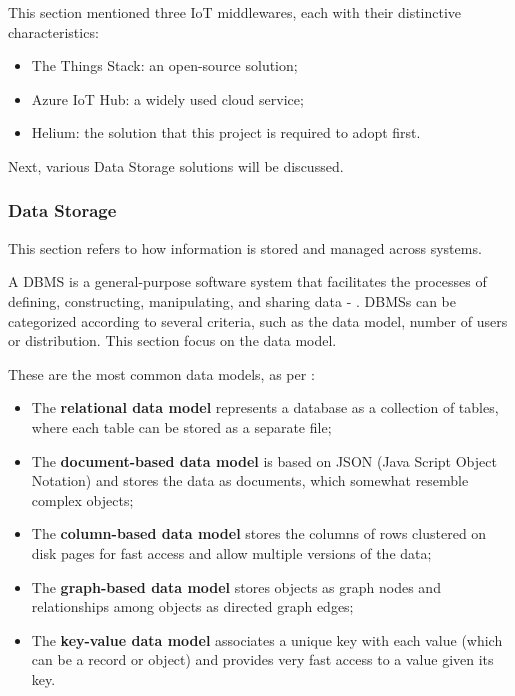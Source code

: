 This section mentioned three \gls{IoT} middlewares, each with their distinctive characteristics:

\begin{itemize}
    \item The Things Stack: an open-source solution;
    \item Azure IoT Hub: a widely used cloud service;
    \item Helium: the solution that this project is required to adopt first.
\end{itemize}

Next, various Data Storage solutions will be discussed.

\subsubsection{Data Storage}
\label{subsubsec:stateofart:arch:infra:store}

This section refers to how information is stored and managed across systems.

A \gls{DBMS} is a general-purpose software system that facilitates the processes of defining, constructing, manipulating, and sharing data - . \gls{DBMS}s can be categorized according to several criteria, such as the data model, number of users or distribution. This section focus on the data model.

These are the most common data models, as per \cite{elmasri2000fundamentals}:

\begin{itemize}
    \item The \textbf{relational data model} represents a database as a collection of tables, where each table can be stored as a separate file;
    \item The \textbf{document-based data model} is based on JSON (Java Script Object Notation) and stores the data as documents, which somewhat resemble complex objects;
    \item The \textbf{column-based data model} stores the columns of rows clustered on disk pages for fast access and allow multiple versions of the data;
    \item The \textbf{graph-based data model} stores objects as graph nodes and relationships among objects as directed graph edges;
    \item The \textbf{key-value data model} associates a unique key with each value (which can be a record or object) and provides very fast access to a value given its key.
\end{itemize}

